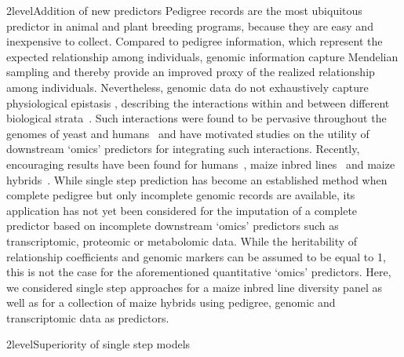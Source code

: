 \documentclass[12pt,titlepage]{article}
\begin{document}
\Genetics2level{Addition of new predictors}
Pedigree records are the most ubiquitous predictor in animal and plant breeding
programs, because they are easy and inexpensive to collect.
Compared to pedigree information, which represent the expected relationship
among individuals, genomic information capture Mendelian sampling and thereby 
provide an improved proxy of the realized relationship among individuals.
Nevertheless, genomic data do not exhaustively capture physiological epistasis 
\cite{Jiang2015,Guo2016,Vazquez2016}, describing the interactions 
within and between different biological strata~\cite{Sackton2016}.
Such interactions were found to be pervasive throughout the genomes of yeast 
\cite{Brem2005} and humans~\cite{Brown2014} and have motivated studies on the 
utility of downstream `omics' predictors for integrating such interactions.
Recently, encouraging results have been found for humans~\cite{Vazquez2016}, 
maize inbred lines~\cite{Guo2016} and maize hybrids~\cite{Westhues2017}.
While single step prediction has become an established method when complete
pedigree but only incomplete genomic records are available, its application has
not yet been considered for the imputation of a complete predictor based on 
incomplete downstream `omics' predictors such as transcriptomic, proteomic or 
metabolomic data.
While the heritability of relationship coefficients and genomic markers can be
assumed to be equal to 1, this is not the case for the aforementioned
quantitative `omics' predictors.
Here, we considered single step approaches for a maize inbred line diversity
panel as well as for a collection of maize hybrids using pedigree, genomic and
transcriptomic data as predictors.


\Genetics2level{Superiority of single step models}
\end{document}
